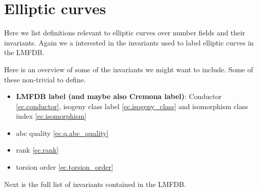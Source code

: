 


\chapter{Elliptic curves}
Here we list definitions relevant to elliptic curves over number fields and their invariants.
Again we a interested in the invariants used to label elliptic curves in the LMFDB.

Here is an overview of some of the invariants we might want to include. Some of these non-trivial to define.

\begin{itemize}
    \item \textbf{LMFDB label (and maybe also Cremona label)}: Conductor \ref{ec.conductor},
      isogeny class label \ref{ec.isogeny_class} and isomorphism class index \ref{ec.isomorphism}
    \item abc quality \ref{ec.q.abc_quality}
    \item rank \ref{ec.rank}
    \item torsion order \ref{ec.torsion_order}
\end{itemize}

Next is the full list of invariants contained in the LMFDB.

